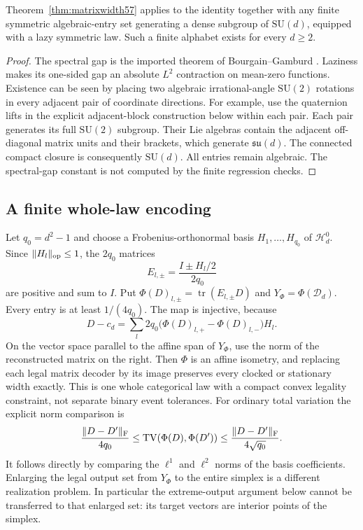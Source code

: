 \begin{corollary}\label{cor:algebraicunitary57}
Theorem~\ref{thm:matrixwidth57} applies to the identity together with any finite symmetric algebraic-entry set generating a dense subgroup of $\mathrm{SU}(d)$, equipped with a lazy symmetric law. Such a finite alphabet exists for every $d\ge2$.
\end{corollary}
\begin{proof}
The spectral gap is the imported theorem of Bourgain--Gamburd \cite{BG2012}. Laziness makes its one-sided gap an absolute $L^2$ contraction on mean-zero functions. Existence can be seen by placing two algebraic irrational-angle $\mathrm{SU}(2)$ rotations in every adjacent pair of coordinate directions. For example, use the quaternion lifts in the explicit adjacent-block construction below within each pair. Each pair generates its full $\mathrm{SU}(2)$ subgroup. Their Lie algebras contain the adjacent off-diagonal matrix units and their brackets, which generate $\mathfrak{su}(d)$. The connected compact closure is consequently $\mathrm{SU}(d)$. All entries remain algebraic. The spectral-gap constant is not computed by the finite regression checks.
\end{proof}

\subsection{A finite whole-law encoding}
Let $q_0=d^2-1$ and choose a Frobenius-orthonormal basis $H_1,\ldots,H_{q_0}$ of $\mathcal H_d^0$. Since $\|H_l\|_{\rm op}\le1$, the $2q_0$ matrices
\[
 E_{l,\pm}=\frac{I\pm H_l/2}{2q_0}
\]
are positive and sum to $I$. Put $\Phi(D)_{l,\pm}=\operatorname{tr}(E_{l,\pm}D)$ and $Y_\Phi=\Phi(\mathcal D_d)$. Every entry is at least $1/(4q_0)$. The map is injective, because
\begin{equation}\label{eq:tomography57}
 D-c_d=\sum_l2q_0\bigl(\Phi(D)_{l,+}-\Phi(D)_{l,-}\bigr)H_l.
\end{equation}
On the vector space parallel to the affine span of $Y_\Phi$, use the norm of the reconstructed matrix on the right. Then $\Phi$ is an affine isometry, and replacing each legal matrix decoder by its image preserves every clocked or stationary width exactly. This is one whole categorical law with a compact convex legality constraint, not separate binary event tolerances. For ordinary total variation the explicit norm comparison is
\[
 \frac{\|D-D'\|_{\rm F}}{4q_0}
 \le\operatorname{TV}(\Phi(D),\Phi(D'))
 \le\frac{\|D-D'\|_{\rm F}}{4\sqrt{q_0}}.
\]
It follows directly by comparing the $\ell^1$ and $\ell^2$ norms of the basis coefficients. Enlarging the legal output set from $Y_\Phi$ to the entire simplex is a different realization problem. In particular the extreme-output argument below cannot be transferred to that enlarged set: its target vectors are interior points of the simplex.

